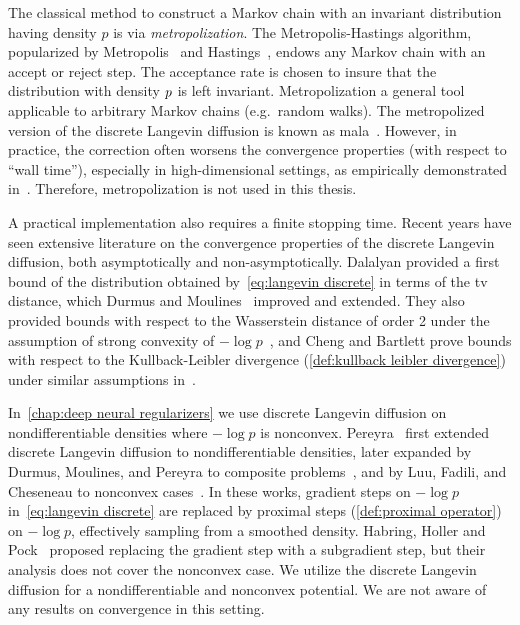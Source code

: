 The classical method to construct a Markov chain with an invariant distribution having density \( p \) is via \emph{metropolization}.
The Metropolis-Hastings algorithm, popularized by Metropolis~\cite{Metropolis1953} and Hastings~\cite{Hastings1970}, endows any Markov chain with an accept or reject step.
The acceptance rate is chosen to insure that the distribution with density \( p \) is left invariant.
Metropolization a general tool applicable to arbitrary Markov chains (e.g.\ random walks).
The metropolized version of the discrete Langevin diffusion is known as \gls{mala}~\cite[section 1.4.2]{roberts_exponential_1996}.
However, in practice, the correction often worsens the convergence properties (with respect to \enquote{wall time}), especially in high-dimensional settings, as empirically demonstrated in~\cite{durmus_efficient_18}.
Therefore, metropolization is not used in this thesis.

A practical implementation also requires a finite stopping time.
Recent years have seen extensive literature on the convergence properties of the discrete Langevin diffusion, both asymptotically and non-asymptotically.
Dalalyan provided a first bound of the distribution obtained by~\cref{eq:langevin discrete} in terms of the \gls{tv} distance, which Durmus and Moulines~\cite{Durmus2017} improved and extended.
They also provided bounds with respect to the Wasserstein distance of order \num{2} under the assumption of strong convexity of \(- \log p \)~\cite{Durmus2019}, and Cheng and Bartlett prove bounds with respect to the Kullback-Leibler divergence (\cref{def:kullback leibler divergence}) under similar assumptions in~\cite{pmlr-v83-cheng18a}.

In~\cref{chap:deep neural regularizers} we use discrete Langevin diffusion on nondifferentiable densities where \( -\log p \) is nonconvex.
Pereyra~\cite{Pereyra2015} first extended discrete Langevin diffusion to nondifferentiable densities, later expanded by Durmus, Moulines, and Pereyra to composite problems~\cite{durmus_efficient_18}, and by Luu, Fadili, and Cheseneau to nonconvex cases~\cite{luu_sampling_2021}.
In these works, gradient steps on \( -\log p \) in~\cref{eq:langevin discrete} are replaced by proximal steps (\cref{def:proximal operator}) on \( -\log p \), effectively sampling from a smoothed density.
Habring, Holler and Pock~\cite{habring2024subgradient} proposed replacing the gradient step with a subgradient step, but their analysis does not cover the nonconvex case.
We utilize the discrete Langevin diffusion for a nondifferentiable and nonconvex potential.
We are not aware of any results on convergence in this setting.
